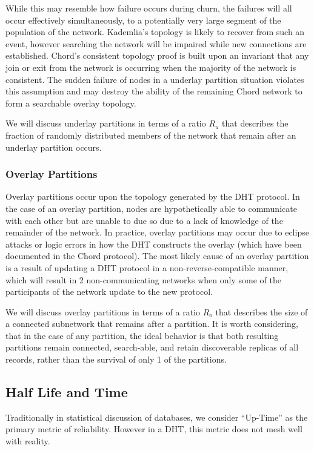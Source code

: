 	
	While this may resemble how failure occurs during churn, the failures will all occur effectively simultaneously, to a potentially very large segment of the population of the network.
	Kademlia's topology is likely to recover from such an event, however searching the network will be impaired while new connections are established.
	Chord's consistent topology proof is built upon an invariant that any join or exit from the network is occurring when the majority of the network is consistent. 
	The sudden failure of nodes in a underlay partition situation violates this assumption and may destroy the ability of the remaining Chord network to form a searchable overlay topology.
	
	We will discuss underlay partitions in terms of a ratio $R_{u}$ that describes the fraction of randomly distributed members of the network that remain after an underlay partition occurs. 
	
	\subsubsection{Overlay Partitions}
	Overlay partitions occur upon the topology generated by the DHT protocol. 
	In the case of an overlay partition, nodes are hypothetically able to communicate with each other but are unable to due so due to a lack of knowledge of the remainder of the network.
	In practice, overlay partitions may occur due to eclipse attacks \cite{dhtsec} or logic errors in how the DHT constructs the overlay (which have been documented in the Chord protocol).
	The most likely cause of an overlay partition is a result of updating a DHT protocol in a non-reverse-compatible manner, which will result in 2 non-communicating networks when only some of the participants of the network update to the new protocol.
	
	We will discuss overlay partitions in terms of a ratio $R_{o}$ that describes the size of a connected subnetwork that remains after a partition.
	It is worth considering, that in the case of any partition, the ideal behavior is that both resulting partitions remain connected, search-able, and retain discoverable replicas of all records, rather than the survival of only 1 of the partitions.
	
	\subsection{Half Life and Time}
	Traditionally in statistical discussion of databases, we consider ``Up-Time'' as the primary metric of reliability.
	However in a DHT, this metric does not mesh well with reality.
	
